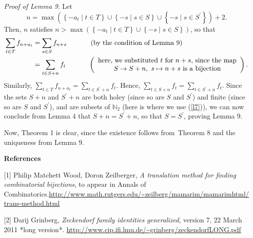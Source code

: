 \documentclass[12pt,final,notitlepage,onecolumn]{article}%
\begin{document}
\textit{Proof of Lemma 9.} Let%
\begin{equation}
n=\max\left(  \left\{  -a_{t}\mid t\in T\right\}  \cup\left\{  -s\mid s\in
S\right\}  \cup\left\{  -s\mid s\in S^{\prime}\right\}  \right)  +2.
\label{l7}%
\end{equation}
Then, $n$ satisfies $n>\max\left(  \left\{  -a_{t}\mid t\in T\right\}
\cup\left\{  -s\mid s\in S\right\}  \right)  $, so that
\begin{align*}
\sum\limits_{t\in T}f_{n+a_{t}}  &  =\sum\limits_{s\in S}f_{n+s}%
\ \ \ \ \ \ \ \ \ \ \left(  \text{by the condition of Lemma 9}\right) \\
&  =\sum\limits_{t\in S+n}f_{t}\ \ \ \ \ \ \ \ \ \ \left(
\begin{array}
[c]{c}%
\text{here, we substituted }t\text{ for }n+s\text{, since the map}\\
S\rightarrow S+n,\ s\mapsto n+s\text{ is a bijection}%
\end{array}
\right)  .
\end{align*}
Similarly, $\sum\limits_{t\in T}f_{n+a_{t}}=\sum\limits_{t\in S^{\prime}%
+n}f_{t}$. Hence, $\sum\limits_{t\in S+n}f_{t}=\sum\limits_{t\in S^{\prime}%
+n}f_{t}$. Since the sets $S+n$ and $S^{\prime}+n$ are both holey (since so
are $S$ and $S^{\prime}$) and finite (since so are $S$ and $S^{\prime}$), and
are subsets of $\mathbb{N}_{2}$ (here is where we use (\ref{l7})), we can now
conclude from Lemma 4 that $S+n=S^{\prime}+n$, so that $S=S^{\prime}$, proving
Lemma 9.

Now, Theorem 1 is clear, since the existence follows from\ Theorem 8 and the
uniqueness from Lemma 9.

\begin{center}
\textbf{References}
\end{center}

[1] Philip Matchett Wood, Doron Zeilberger, \textit{A translation method for
finding combinatorial bijections}, to appear in Annals of
Combinatorics.\newline\url{http://www.math.rutgers.edu/~zeilberg/mamarim/mamarimhtml/trans-method.html}

[2] Darij Grinberg, \textit{Zeckendorf family identities generalized}, version
7, 22 March 2011 *long version*.\newline
\url{http://www.cip.ifi.lmu.de/~grinberg/zeckendorfLONG.pdf}
\end{document}
